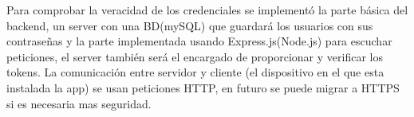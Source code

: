 Para comprobar la veracidad de los credenciales se implementó la parte básica del backend, un server con una BD(mySQL) que guardará los usuarios con sus contraseñas y la parte implementada usando Express.js(Node.js) para escuchar peticiones, el server también será el encargado de proporcionar y verificar los tokens. La comunicación entre servidor y cliente (el dispositivo en el que esta instalada la app) se usan peticiones HTTP, en futuro se puede migrar a HTTPS si es necesaria mas seguridad.


